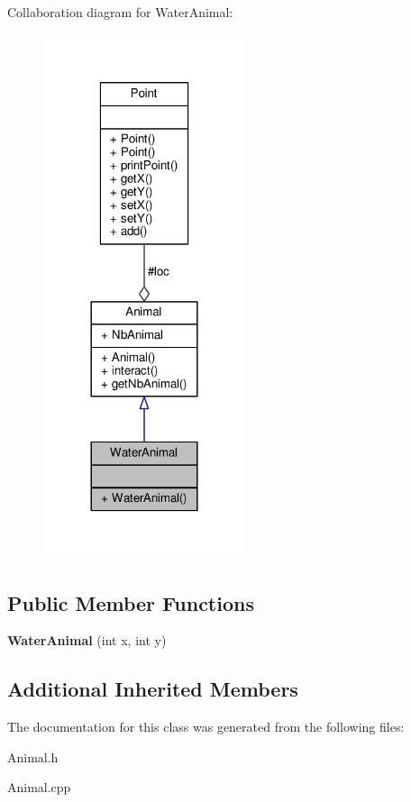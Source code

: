 Collaboration diagram for Water\+Animal\+:
\nopagebreak
\begin{figure}[H]
\begin{center}
\leavevmode
\includegraphics[width=168pt]{classWaterAnimal__coll__graph}
\end{center}
\end{figure}
\subsection*{Public Member Functions}
\begin{DoxyCompactItemize}
\item 
{\bfseries Water\+Animal} (int x, int y)\hypertarget{classWaterAnimal_ab11245c8547382631a6ae1053443ad72}{}\label{classWaterAnimal_ab11245c8547382631a6ae1053443ad72}

\end{DoxyCompactItemize}
\subsection*{Additional Inherited Members}


The documentation for this class was generated from the following files\+:\begin{DoxyCompactItemize}
\item 
Animal.\+h\item 
Animal.\+cpp\end{DoxyCompactItemize}
